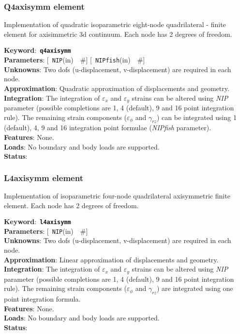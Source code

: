 \documentclass[a4paper]{article}
\newcommand{\descitem}[1]{{\noindent \bf #1}:}
\newcommand{\elemkeyword}[1]{\descitem{Keyword}~{\bf \texttt{#1}}}
\newcommand{\elemparam}[2]{{{\texttt{#1}\tiny (#2)}~~\#}}
\newcommand{\optelemparam}[2]{{[~\elemparam{#1}{#2}]}}
\newcommand{\param}[1]{{\em #1}}
\begin{document}
\subsubsection{Q4axisymm element}
Implementation of quadratic isoparametric eight-node quadrilateral -
finite element for axisimmetric 3d continuum. 
Each node has 2 degrees of freedom.

\elemkeyword{q4axisymm}\\
\descitem{Parameters} \optelemparam{NIP}{in} \optelemparam{NIPfish}{in}\\
\descitem{Unknowns}
Two dofs (u-displacement, v-displacement) are required in each node.\\
\descitem{Approximation} Quadratic approximation of displacements and
geometry.\\
\descitem{Integration}
The integration of $\varepsilon_x$ and $\varepsilon_y$ strains can be altered using
\param{NIP} parameter (possible completions are 1, 4 (default), 9 and 16
point integration rule). The remaining strain components ($\varepsilon_\phi$ and
$\gamma_{rz}$) can be integrated using 1 (default), 4, 9 and 16 integration
point formulae (\param{NIPfish} parameter).\\
\descitem{Features} None.\\
\descitem{Loads} No boundary and body loads are supported.\\
\descitem{Status} 

\subsubsection{L4axisymm element}
Implementation of isoparametric four-node quadrilateral axisymmetric
finite element. Each node has 2 degrees of freedom.

\elemkeyword{l4axisymm}\\
\descitem{Parameters} \optelemparam{NIP}{in}\\
\descitem{Unknowns}
Two dofs (u-displacement, v-displacement) are required in each node.\\
\descitem{Approximation} Linear approximation of displacements and
geometry.\\
\descitem{Integration}
The integration of $\varepsilon_x$ and $\varepsilon_y$ strains can be altered using
\param{NIP} parameter (possible completions are 1, 4 (default), 9 and 16
point integration rule). The remaining strain components ($\varepsilon_\phi$ and
$\gamma_{rz}$) are integrated using one point integration formula.\\
\descitem{Features} None.\\
\descitem{Loads} No boundary and body loads are supported.\\
\descitem{Status} 
\end{document}
